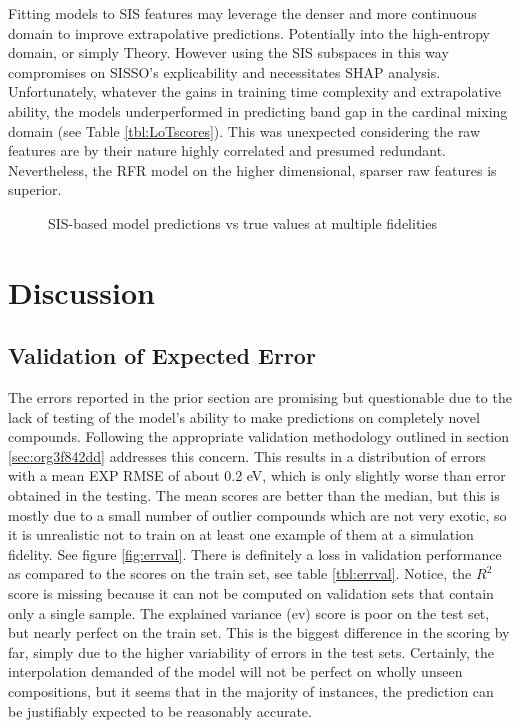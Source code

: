 Fitting models to SIS features may leverage the denser and more continuous domain to improve extrapolative predictions.
Potentially into the high-entropy domain, or simply Theory.
However using the SIS subspaces in this way compromises on SISSO's explicability and necessitates SHAP analysis.
Unfortunately, whatever the gains in training time complexity and extrapolative ability, the models underperformed in predicting band gap in the cardinal mixing domain (see Table \ref{tbl:LoTscores}).
This was unexpected considering the raw features are by their nature highly correlated and presumed redundant.
Nevertheless, the RFR model on the higher dimensional, sparser raw features is superior.

 
\begin{figure}[htbp]
\centering

\caption{\label{fig:sis-pairplots} SIS-based model predictions vs true values at multiple fidelities}
\end{figure}

\section{Discussion}
\label{sec:orgb2d5fd7}
\subsection{Validation of Expected Error}
\label{sec:orgee265d6}
The errors reported in the prior section are promising but questionable due to the lack of testing of the model's ability to make predictions on completely novel compounds.
Following the appropriate validation methodology outlined in section \ref{sec:org3f842dd} addresses this concern.
This results in a distribution of errors with a mean EXP RMSE of about 0.2 \unit{\electronvolt}, which is only slightly worse than error obtained in the testing.
The mean scores are better than the median, but this is mostly due to a small number of outlier compounds which are not very exotic, so it is unrealistic not to train on at least one example of them at a simulation fidelity.
See figure \ref{fig:errval}.
There is definitely a loss in validation performance as compared to the scores on the train set, see table \ref{tbl:errval}.
Notice, the \(R^2\) score is missing because it can not be computed on validation sets that contain only a single sample.
The explained variance (ev) score is poor on the test set, but nearly perfect on the train set.
This is the biggest difference in the scoring by far, simply due to the higher variability of errors in the test sets.
Certainly, the interpolation demanded of the model will not be perfect on wholly unseen compositions, but it seems that in the majority of instances, the prediction can be justifiably expected to be reasonably accurate.

